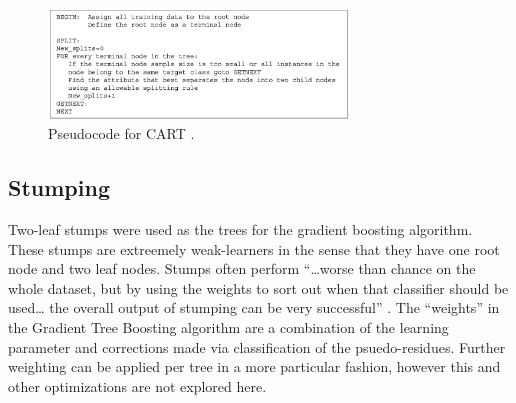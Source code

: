\documentclass[letterpaper]{article} %
\begin{document}
\begin{figure}[htbp]
\centerline{\includegraphics[width=8cm]{cart.png}}
\caption{Pseudocode for CART
\cite{top10}.}
\label{fig:cart}
\end{figure}

\subsection{Stumping}
Two-leaf stumps were used as the trees for the gradient boosting algorithm.
These stumps are extreemely weak-learners in the sense that they have one root node
and two leaf nodes.
Stumps often perform ``\dots worse than chance on the whole dataset,
but by using the weights to sort out when that classifier should be used\dots
the overall output of stumping can be very successful'' \cite{machine_learning}. %
The ``weights'' in the Gradient Tree Boosting algorithm are a combination of
the learning parameter and corrections made via classification of the psuedo-residues.
Further weighting can be applied per tree in a more particular
fashion, however this and other optimizations are not explored here.
\end{document}
